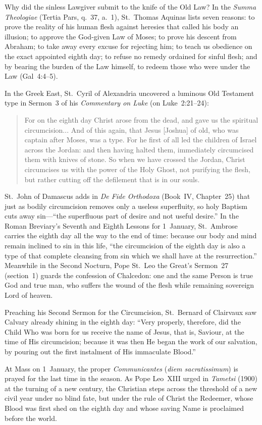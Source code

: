 Why did the sinless Lawgiver submit to the knife of the Old Law? In the
\textit{Summa Theologiae} (Tertia Pars, q.~37, a.~1), St.~Thomas Aquinas lists
seven reasons: to prove the reality of his human flesh against heresies that
called his body an illusion; to approve the God-given Law of Moses; to prove
his descent from Abraham; to take away every excuse for rejecting him; to teach
us obedience on the exact appointed eighth day; to refuse no remedy ordained for
sinful flesh; and by bearing the burden of the Law himself, to redeem those who
were under the Law (Gal~4:4--5).

In the Greek East, St.~Cyril of Alexandria uncovered a luminous Old Testament
type in Sermon~3 of his \textit{Commentary on Luke} (on Luke~2:21--24):

\begin{quote}
For on the eighth day Christ arose from the dead, and gave us the spiritual
circumcision... And of this again, that Jesus [Joshua] of old, who was captain
after Moses, was a type. For he first of all led the children of Israel across
the Jordan: and then having halted them, immediately circumcised them with
knives of stone. So when we have crossed the Jordan, Christ circumcises us with
the power of the Holy Ghost, not purifying the flesh, but rather cutting off the
defilement that is in our souls.
\end{quote}

St.~John of Damascus adds in \textit{De Fide Orthodoxa} (Book~IV, Chapter~25)
that just as bodily circumcision removes only a useless superfluity, so holy
Baptism cuts away sin---``the superfluous part of desire and not useful
desire.'' In the Roman Breviary's Seventh and Eighth Lessons for 1~January,
St.~Ambrose carries the eighth day all the way to the end of time: because our
body and mind remain inclined to sin in this life, ``the circumcision of the
eighth day is also a type of that complete cleansing from sin which we shall
have at the resurrection.'' Meanwhile in the Second Nocturn, Pope St.~Leo the
Great's Sermon~27 (section~1) guards the confession of Chalcedon: one and the
same Person is true God and true man, who suffers the wound of the flesh while
remaining sovereign Lord of heaven.

Preaching his Second Sermon for the Circumcision, St.~Bernard of Clairvaux saw
Calvary already shining in the eighth day: ``Very properly, therefore, did the
Child Who was born for us receive the name of Jesus, that is, Saviour, at the
time of His circumcision; because it was then He began the work of our
salvation, by pouring out the first instalment of His immaculate Blood.''

At Mass on 1~January, the proper \textit{Communicantes} (\textit{diem
sacratissimum}) is prayed for the last time in the season. As Pope Leo~XIII
urged in \textit{Tametsi} (1900) at the turning of a new century, the Christian
steps across the threshold of a new civil year under no blind fate, but under
the rule of Christ the Redeemer, whose Blood was first shed on the eighth day
and whose saving Name is proclaimed before the world.
